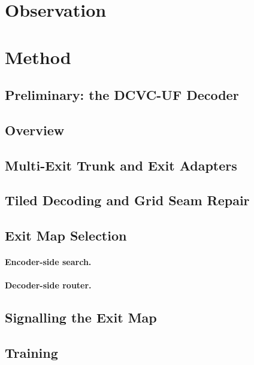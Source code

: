 \section{Observation}
\label{sec:observation}

\section{Method}
\label{sec:method}

\subsection{Preliminary: the DCVC-UF Decoder}
\label{sec:prelim}

\subsection{Overview}
\label{sec:overview}

\subsection{Multi-Exit Trunk and Exit Adapters}
\label{sec:ladder}

\subsection{Tiled Decoding and Grid Seam Repair}
\label{sec:tiling}

\subsection{Exit Map Selection}
\label{sec:selection}

\paragraph{Encoder-side search.}

\paragraph{Decoder-side router.}

\subsection{Signalling the Exit Map}
\label{sec:signalling}

\subsection{Training}
\label{sec:training}
